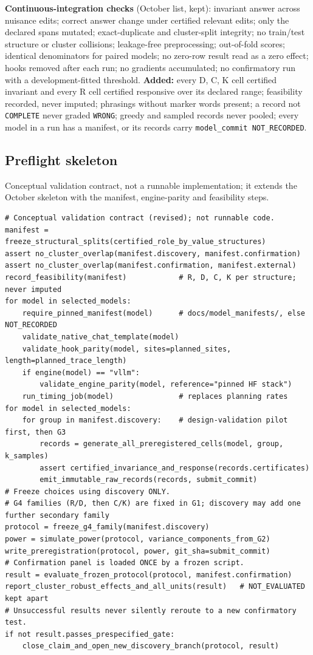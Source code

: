 \documentclass[10pt,a4paper]{article}
\begin{document}
\textbf{Continuous-integration checks} (October list, kept): invariant answer across nuisance edits; correct
answer change under certified relevant edits; only the declared spans mutated; exact-duplicate and cluster-split
integrity; no train/test structure or cluster collisions; leakage-free preprocessing; out-of-fold scores;
identical denominators for paired models; no zero-row result read as a zero effect; hooks removed after each
run; no gradients accumulated; no confirmatory run with a development-fitted threshold. \textbf{Added:} every D,
C, K cell certified invariant and every R cell certified responsive over its declared range; feasibility recorded,
never imputed; phrasings without marker words present; a record not \texttt{COMPLETE} never graded
\texttt{WRONG}; greedy and sampled records never pooled; every model in a run has a manifest, or its records carry
\texttt{model\_commit NOT\_RECORDED}.

\subsection{Preflight skeleton}
\label{sec:preflight}

Conceptual validation contract, not a runnable implementation; it extends the October skeleton with the
manifest, engine-parity and feasibility steps.

\begin{verbatim}
# Conceptual validation contract (revised); not runnable code.
manifest = freeze_structural_splits(certified_role_by_value_structures)
assert no_cluster_overlap(manifest.discovery, manifest.confirmation)
assert no_cluster_overlap(manifest.confirmation, manifest.external)
record_feasibility(manifest)            # R, D, C, K per structure; never imputed
for model in selected_models:
    require_pinned_manifest(model)      # docs/model_manifests/, else NOT_RECORDED
    validate_native_chat_template(model)
    validate_hook_parity(model, sites=planned_sites, length=planned_trace_length)
    if engine(model) == "vllm":
        validate_engine_parity(model, reference="pinned HF stack")
    run_timing_job(model)               # replaces planning rates
for model in selected_models:
    for group in manifest.discovery:    # design-validation pilot first, then G3
        records = generate_all_preregistered_cells(model, group, k_samples)
        assert certified_invariance_and_response(records.certificates)
        emit_immutable_raw_records(records, submit_commit)
# Freeze choices using discovery ONLY.
# G4 families (R/D, then C/K) are fixed in G1; discovery may add one further secondary family
protocol = freeze_g4_family(manifest.discovery)
power = simulate_power(protocol, variance_components_from_G2)
write_preregistration(protocol, power, git_sha=submit_commit)
# Confirmation panel is loaded ONCE by a frozen script.
result = evaluate_frozen_protocol(protocol, manifest.confirmation)
report_cluster_robust_effects_and_all_units(result)   # NOT_EVALUATED kept apart
# Unsuccessful results never silently reroute to a new confirmatory test.
if not result.passes_prespecified_gate:
    close_claim_and_open_new_discovery_branch(protocol, result)
\end{verbatim}
\end{document}
